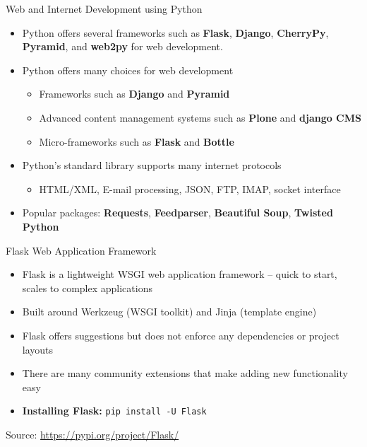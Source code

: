 \documentclass[aspectratio=169, xcolor=dvipsnames]{beamer}
\begin{document}
\begin{frame}{Web and Internet Development using Python}
    \begin{itemize}[<+->]
        \item Python offers several frameworks such as \textbf{Flask}, \textbf{Django}, \textbf{CherryPy}, \textbf{Pyramid}, and \textbf{web2py} for web development.
        \item Python offers many choices for web development
        \begin{itemize}
            \item[$\triangleright$] Frameworks such as \textbf{Django} and \textbf{Pyramid}
            \item[$\triangleright$] Advanced content management systems such as \textbf{Plone} and \textbf{django CMS}
            \item[$\triangleright$] Micro-frameworks such as \textbf{Flask} and \textbf{Bottle}
        \end{itemize}
        \item Python's standard library supports many internet protocols
        \begin{itemize}
            \item[$\triangleright$] HTML/XML, E-mail processing, JSON, FTP, IMAP, socket interface
        \end{itemize}
        \item Popular packages: \textbf{Requests}, \textbf{Feedparser}, \textbf{Beautiful Soup}, \textbf{Twisted Python}
    \end{itemize}
\end{frame}

\begin{frame}{Flask Web Application Framework}
    \begin{itemize}[<+->]
        \item Flask is a lightweight WSGI web application framework -- quick to start, scales to complex applications
        \item Built around Werkzeug (WSGI toolkit) and Jinja (template engine)
        \item Flask offers suggestions but does not enforce any dependencies or project layouts
        \item There are many community extensions that make adding new functionality easy
        \item \textbf{Installing Flask:} \texttt{pip install -U Flask}
    \end{itemize}
    \vspace{1em}
    \small Source: \url{https://pypi.org/project/Flask/}
\end{frame}
\end{document}
